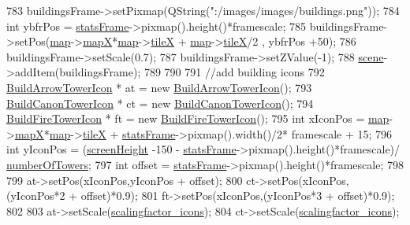 \begin{DoxyCode}
783     buildingsFrame->setPixmap(QString(\textcolor{stringliteral}{":/images/images/buildings.png"}));
784     \textcolor{keywordtype}{int} ybfrPos = \hyperlink{class_game_a3b40718d348c0f12af63a3f428924ab4}{statsFrame}->pixmap().height()*framescale;
785     buildingsFrame->setPos(\hyperlink{class_game_acef3a39fdf14be2c980b0dc11e7be402}{map}->\hyperlink{class_map_acfd20721da29a2e353598555e23e12f0}{mapX}*\hyperlink{class_game_acef3a39fdf14be2c980b0dc11e7be402}{map}->\hyperlink{class_map_af2aa425dd22aba483ae973c4a15fe934}{tileX} + \hyperlink{class_game_acef3a39fdf14be2c980b0dc11e7be402}{map}->\hyperlink{class_map_af2aa425dd22aba483ae973c4a15fe934}{tileX}/2 , ybfrPos +50);
786     buildingsFrame->setScale(0.7);
787     buildingsFrame->setZValue(-1);
788     \hyperlink{class_game_a8119e3b9a632906c6808fa294b46a92a}{scene}->addItem(buildingsFrame);
789 
790 
791     \textcolor{comment}{//add building icons}
792     \hyperlink{class_build_arrow_tower_icon}{BuildArrowTowerIcon} * at = \textcolor{keyword}{new} \hyperlink{class_build_arrow_tower_icon}{BuildArrowTowerIcon}();
793     \hyperlink{class_build_canon_tower_icon}{BuildCanonTowerIcon} * ct = \textcolor{keyword}{new} \hyperlink{class_build_canon_tower_icon}{BuildCanonTowerIcon}();
794     \hyperlink{class_build_fire_tower_icon}{BuildFireTowerIcon} * ft = \textcolor{keyword}{new} \hyperlink{class_build_fire_tower_icon}{BuildFireTowerIcon}();
795     \textcolor{keywordtype}{int} xIconPos = \hyperlink{class_game_acef3a39fdf14be2c980b0dc11e7be402}{map}->\hyperlink{class_map_acfd20721da29a2e353598555e23e12f0}{mapX}*\hyperlink{class_game_acef3a39fdf14be2c980b0dc11e7be402}{map}->\hyperlink{class_map_af2aa425dd22aba483ae973c4a15fe934}{tileX} + \hyperlink{class_game_a3b40718d348c0f12af63a3f428924ab4}{statsFrame}->pixmap().width()/2*
      framescale + 15;
796     \textcolor{keywordtype}{int} yIconPos = (\hyperlink{class_game_a329351d67993953391a6a65db536c017}{screenHeight} -150 - \hyperlink{class_game_a3b40718d348c0f12af63a3f428924ab4}{statsFrame}->pixmap().height()*framescale)/
      \hyperlink{class_game_ad83fa5ba7b6421882d874704c7416033}{numberOfTowers};
797     \textcolor{keywordtype}{int} offset = \hyperlink{class_game_a3b40718d348c0f12af63a3f428924ab4}{statsFrame}->pixmap().height()*framescale;
798 
799     at->setPos(xIconPos,yIconPos + offset);
800     ct->setPos(xIconPos,(yIconPos*2 + offset)*0.9);
801     ft->setPos(xIconPos,(yIconPos*3 + offset)*0.9);
802 
803     at->setScale(\hyperlink{class_game_a50835e7c47a3e5d6fc919ce3a163be88}{scalingfactor\_icons});
804     ct->setScale(\hyperlink{class_game_a50835e7c47a3e5d6fc919ce3a163be88}{scalingfactor\_icons});

\end{DoxyCode}

